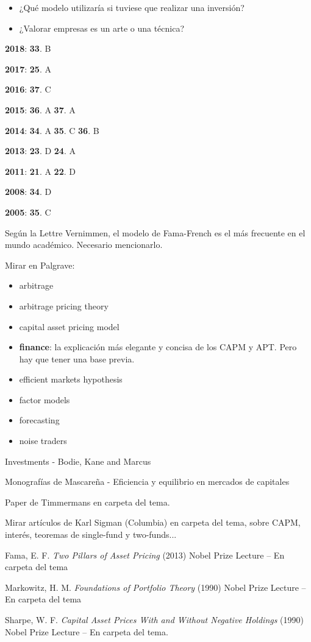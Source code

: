 \documentclass{nuevotema}
\begin{document}
\begin{itemize}
    \item ¿Qué modelo utilizaría si tuviese que realizar una inversión?
    \item ¿Valorar empresas es un arte o una técnica?
\end{itemize}

\notas

\textbf{2018}: \textbf{33}. B
 
\textbf{2017}: \textbf{25}. A

\textbf{2016}: \textbf{37}. C

\textbf{2015}: \textbf{36}. A \textbf{37}. A

\textbf{2014}: \textbf{34}. A \textbf{35}. C \textbf{36}. B

\textbf{2013}: \textbf{23}. D \textbf{24}. A

\textbf{2011}: \textbf{21}. A \textbf{22}. D

\textbf{2008}: \textbf{34}. D

\textbf{2005}: \textbf{35}. C

Según la Lettre Vernimmen, el modelo de Fama-French es el más frecuente en el mundo académico. Necesario mencionarlo.


\bibliografia

Mirar en Palgrave:
\begin{itemize}
	\item arbitrage
	\item arbitrage pricing theory
    \item capital asset pricing model
    \item \textbf{finance}: la explicación más elegante y concisa de los CAPM y APT. Pero hay que tener una base previa.
    \item efficient markets hypothesis
    \item factor models
    \item forecasting
    \item noise traders
\end{itemize}

Investments - Bodie, Kane and Marcus

Monografías de Mascareña - Eficiencia y equilibrio en mercados de capitales

Paper de Timmermans en carpeta del tema.

Mirar artículos de Karl Sigman (Columbia) en carpeta del tema, sobre CAPM, interés, teoremas de single-fund y two-funds...

Fama, E. F. \textit{Two Pillars of Asset Pricing} (2013) Nobel Prize Lecture -- En carpeta del tema

Markowitz, H. M. \textit{Foundations of Portfolio Theory} (1990) Nobel Prize Lecture -- En carpeta del tema

Sharpe, W. F. \textit{Capital Asset Prices With and Without Negative Holdings} (1990) Nobel Prize Lecture -- En carpeta del tema.
\end{document}

